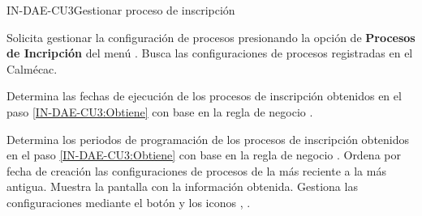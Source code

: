 \begin{UseCase}{IN-DAE-CU3}{Gestionar proceso de inscripción}
\end{UseCase}


\begin{UCtrayectoria}
	\UCpaso [\UCactor] Solicita gestionar la configuración de procesos presionando la opción de \textbf{Procesos de Incripción} del menú .
	\UCpaso \label{IN-DAE-CU3:Obtiene} Busca las configuraciones de procesos registradas en el Calmécac.
	
	\UCpaso Determina las fechas de ejecución de los procesos de inscripción obtenidos en el paso \ref{IN-DAE-CU3:Obtiene} con base en la regla de negocio .
	
	\UCpaso Determina los periodos de programación de los procesos de inscripción obtenidos en el paso \ref{IN-DAE-CU3:Obtiene} con base en la regla de negocio .
	\UCpaso Ordena por fecha de creación las configuraciones de procesos de la más reciente a la más antigua. 
	\UCpaso Muestra la pantalla  con la información obtenida.%
	\UCpaso [\UCactor] \label{IN-DAE-CU3:Gestionar} Gestiona las configuraciones mediante el botón  y los iconos {\IUEditar}, {\IUEliminar}.
\end{UCtrayectoria}

